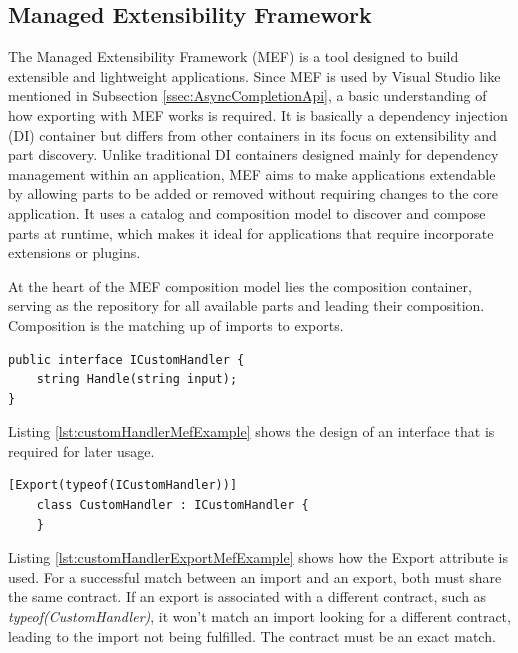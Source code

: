 \newpage
\subsection{Managed Extensibility Framework}
\label{ssec:ManagedExtensibilityFramework}
The Managed Extensibility Framework (MEF) is a tool designed to build extensible and lightweight applications. Since MEF is used by Visual Studio like mentioned in Subsection \ref{ssec:AsyncCompletionApi}, a basic understanding of how exporting with MEF works is required. It is basically a dependency injection (DI) container but differs from other containers in its focus on extensibility and part discovery. Unlike traditional DI containers designed mainly for dependency management within an application, MEF aims to make applications extendable by allowing parts to be added or removed without requiring changes to the core application. It uses a catalog and composition model to discover and compose parts at runtime, which makes it ideal for applications that require incorporate extensions or plugins.

At the heart of the MEF composition model lies the composition container, serving as the repository for all available parts and leading their composition. Composition is the matching up of imports to exports.
\begin{lstlisting}[style=CSharp, caption={ICustomHandler for MEF example}, label={lst:customHandlerMefExample}]
public interface ICustomHandler {
	string Handle(string input);
}
\end{lstlisting}
Listing \ref{lst:customHandlerMefExample} shows the design of an interface that is required for later usage.

\begin{lstlisting}[style=CSharp, caption={CustomHandler export for MEF example}, label={lst:customHandlerExportMefExample}]
	[Export(typeof(ICustomHandler))]
	class CustomHandler : ICustomHandler {
	}
\end{lstlisting}
Listing \ref{lst:customHandlerExportMefExample} shows how the Export attribute is used. For a successful match between an import and an export, both must share the same contract. If an export is associated with a different contract, such as \textit{typeof(CustomHandler)}, it won't match an import looking for a different contract, leading to the import not being fulfilled. The contract must be an exact match.

